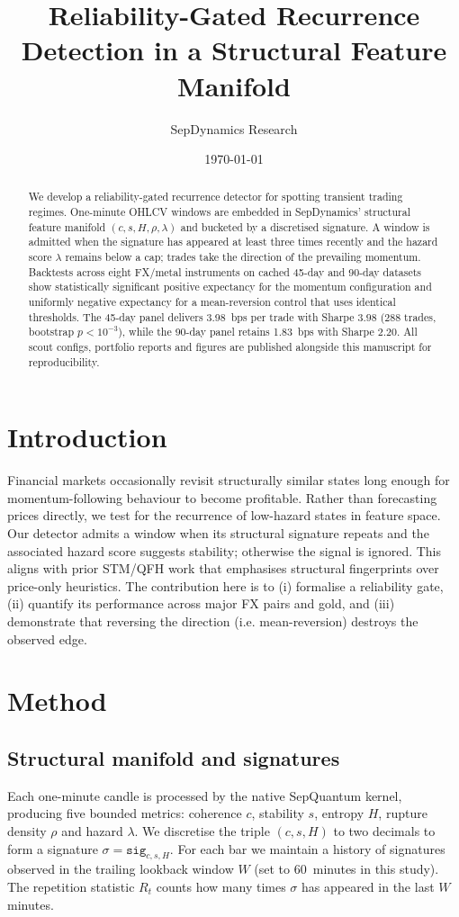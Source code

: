 \documentclass[11pt]{article}
\title{Reliability-Gated Recurrence Detection in a Structural Feature Manifold}
\author{SepDynamics Research}
\date{\today}
\begin{document}
\maketitle

\begin{abstract}
We develop a reliability-gated recurrence detector for spotting
transient trading regimes.  One-minute OHLCV windows are embedded in
SepDynamics' structural feature manifold $(c,s,H,\rho,\lambda)$ and
bucketed by a discretised signature.  A window is admitted when the
signature has appeared at least three times recently and the hazard
score $\lambda$ remains below a cap; trades take the direction of the
prevailing momentum.  Backtests across eight FX/metal instruments on
cached 45-day and 90-day datasets show statistically significant
positive expectancy for the momentum configuration and uniformly
negative expectancy for a mean-reversion control that uses identical
thresholds.  The 45-day panel delivers \SI{3.98}{bps} per trade with
Sharpe \(3.98\) (288 trades, bootstrap \(p<10^{-3}\)), while the
90-day panel retains \SI{1.83}{bps} with Sharpe \(2.20\).  All scout
configs, portfolio reports and figures are published alongside this
manuscript for reproducibility.
\end{abstract}

\section{Introduction}
Financial markets occasionally revisit structurally similar states
long enough for momentum-following behaviour to become profitable.
Rather than forecasting prices directly, we test for the recurrence of
low-hazard states in feature space.  Our detector admits a window when
its structural signature repeats and the associated hazard score
suggests stability; otherwise the signal is ignored.  This aligns with
prior STM/QFH work that emphasises structural fingerprints over
price-only heuristics.  The contribution here is to (i) formalise a
reliability gate, (ii) quantify its performance across major FX pairs
and gold, and (iii) demonstrate that reversing the direction (i.e.
mean-reversion) destroys the observed edge.

\section{Method}

\subsection{Structural manifold and signatures}
Each one-minute candle is processed by the native SepQuantum kernel,
producing five bounded metrics: coherence $c$, stability $s$, entropy
$H$, rupture density $\rho$ and hazard $\lambda$.  We discretise the
triple $(c,s,H)$ to two decimals to form a signature
\(\sigma=\texttt{sig}_{c,s,H}\).  For each bar we maintain a history of
signatures observed in the trailing lookback window $W$ (set to
\SI{60}{minutes} in this study).  The repetition statistic $R_t$ counts
how many times $\sigma$ has appeared in the last $W$ minutes.
\end{document}
